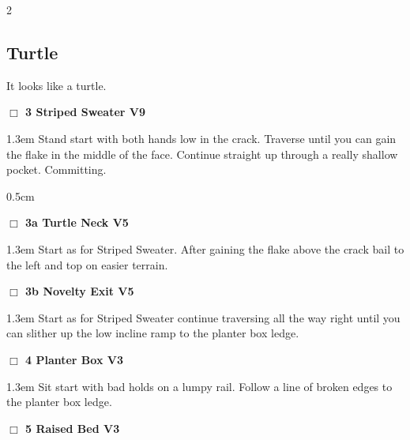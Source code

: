 	\begin{multicols}{2}
\needspace{10em}
\subsection*{Turtle}\label{bf:Turtle}
It looks like a turtle.\\
\needspace{2em}
\label{rt:Striped Sweater}
\colorbox{Goldenrod!50}{
\parbox{0.95\linewidth}{
\hspace{-1ex}\textbf{$\Box$
3 Striped Sweater V9  \warn
}}}
\begin{adjustwidth}{1.3em}{}			
Stand start with both hands low in the crack. Traverse until you can gain the flake in the middle of the face. Continue straight up through a really shallow pocket. Committing.
\end{adjustwidth}
\begin{adjustwidth}{0.5cm}{}				
\needspace{4em}
\needspace{2em}
\label{vr:Turtle Neck}
\colorbox{RoyalBlue!20}{
\parbox{0.95\linewidth}{
\hspace{-1ex}\textbf{$\Box$
3a Turtle Neck V5  \warn
}}}
\begin{adjustwidth}{1.3em}{}			
Start as for Striped Sweater. After gaining the flake above the crack bail to the left and top on easier terrain.
\end{adjustwidth}
\needspace{2em}
\label{vr:Novelty Exit}
\colorbox{RoyalBlue!20}{
\parbox{0.95\linewidth}{
\hspace{-1ex}\textbf{$\Box$
3b Novelty Exit V5  
}}}
\begin{adjustwidth}{1.3em}{}			
Start as for Striped Sweater continue traversing all the way right until you can slither up the low incline ramp to the planter box ledge.
\end{adjustwidth}
\end{adjustwidth}
\needspace{2em}
\label{rt:Planter Box}
\colorbox{green!20}{
\parbox{0.95\linewidth}{
\hspace{-1ex}\textbf{$\Box$
4 Planter Box V3  
}}}
\begin{adjustwidth}{1.3em}{}			
Sit start with bad holds on a lumpy rail. Follow a line of broken edges to the planter box ledge.
\end{adjustwidth}
\needspace{2em}
\label{rt:Raised Bed}
\colorbox{green!20}{
\parbox{0.95\linewidth}{
\hspace{-1ex}\textbf{$\Box$
5 Raised Bed V3  
}}}
\end{multicols}
